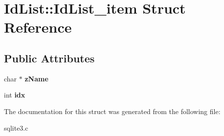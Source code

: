 \hypertarget{structIdList_1_1IdList__item}{}\section{Id\+List\+:\+:Id\+List\+\_\+item Struct Reference}
\label{structIdList_1_1IdList__item}
\subsection*{Public Attributes}
\begin{DoxyCompactItemize}
\item 
char $\ast$ {\bfseries z\+Name}\hypertarget{structIdList_1_1IdList__item_acd44e1182dc46441939cd6a5d935724c}{}\label{structIdList_1_1IdList__item_acd44e1182dc46441939cd6a5d935724c}

\item 
int {\bfseries idx}\hypertarget{structIdList_1_1IdList__item_a869d1a5ee03bcb018e38fae6c9ac0572}{}\label{structIdList_1_1IdList__item_a869d1a5ee03bcb018e38fae6c9ac0572}

\end{DoxyCompactItemize}


The documentation for this struct was generated from the following file\+:\begin{DoxyCompactItemize}
\item 
sqlite3.\+c\end{DoxyCompactItemize}
